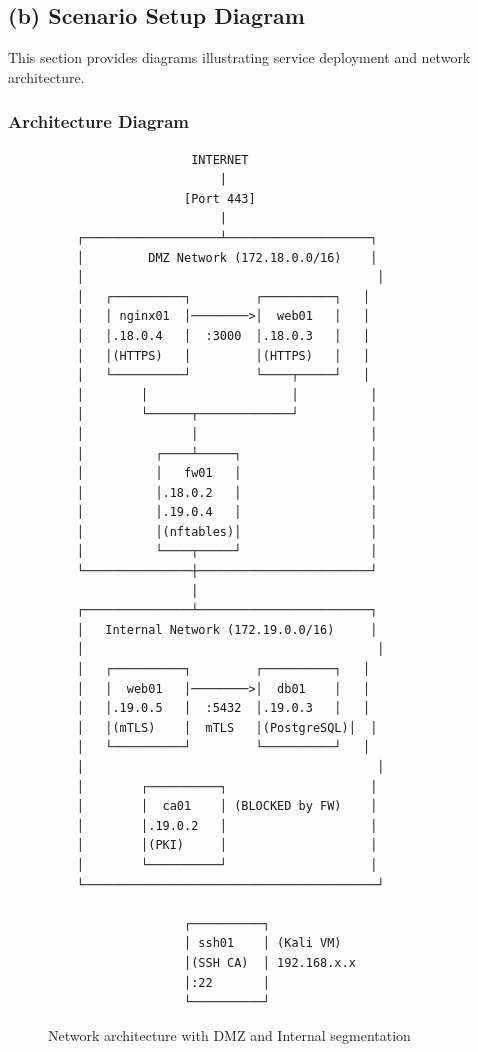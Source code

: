 \subsection{(b) Scenario Setup Diagram}

This section provides diagrams illustrating service deployment and network architecture.

\subsubsection{Architecture Diagram}

\begin{figure}[h]
\centering
\begin{verbatim}
                    INTERNET
                        |
                   [Port 443]
                        |
    ┌───────────────────┴────────────────────┐
    │         DMZ Network (172.18.0.0/16)    │
    │                                         │
    │   ┌──────────┐         ┌──────────┐   │
    │   │ nginx01  │────────>│  web01   │   │
    │   │.18.0.4   │  :3000  │.18.0.3   │   │
    │   │(HTTPS)   │         │(HTTPS)   │   │
    │   └──────────┘         └────┬─────┘   │
    │        │                    │          │
    │        └──────┬─────────────┘          │
    │               │                        │
    │          ┌────┴─────┐                  │
    │          │   fw01   │                  │
    │          │.18.0.2   │                  │
    │          │.19.0.4   │                  │
    │          │(nftables)│                  │
    │          └────┬─────┘                  │
    └───────────────┼────────────────────────┘
                    │
    ┌───────────────┴────────────────────────┐
    │   Internal Network (172.19.0.0/16)     │
    │                                         │
    │   ┌──────────┐         ┌──────────┐   │
    │   │  web01   │────────>│  db01    │   │
    │   │.19.0.5   │  :5432  │.19.0.3   │   │
    │   │(mTLS)    │  mTLS   │(PostgreSQL)│  │
    │   └──────────┘         └──────────┘   │
    │                                         │
    │        ┌──────────┐                    │
    │        │  ca01    │ (BLOCKED by FW)    │
    │        │.19.0.2   │                    │
    │        │(PKI)     │                    │
    │        └──────────┘                    │
    └─────────────────────────────────────────┘

                   ┌──────────┐
                   │ ssh01    │ (Kali VM)
                   │(SSH CA)  │ 192.168.x.x
                   │:22       │
                   └──────────┘
\end{verbatim}
\caption{Network architecture with DMZ and Internal segmentation}
\end{figure}


